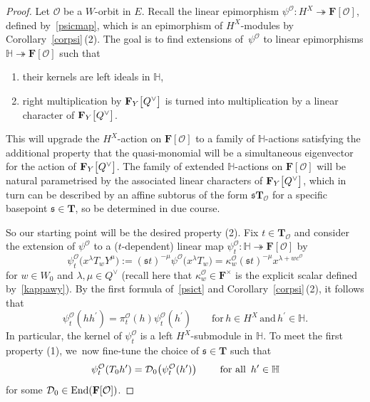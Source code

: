 \documentclass[11pt]{article}
\numberwithin{equation}{section}
\numberwithin{equation}{section}
\begin{document}
\begin{proof}
Let $\mathcal{O}$ be a $W$-orbit in $E$.
Recall the linear epimorphism $\psi^\mathcal{O}\colon H^X\twoheadrightarrow\mathbf{F}[\mathcal{O}]$,
defined by~\eqref{psicmap}, which is an epimorphism of $H^X$-modules by Corollary~\ref{corpsi}\,(2). The goal is to find extensions of~$\psi^{\mathcal{O}}$ to linear epimorphisms $\mathbb{H}\twoheadrightarrow\mathbf{F}[\mathcal{O}]$ such that
\begin{enumerate}\itemsep=0pt
\item[(1)] their kernels are left ideals in $\mathbb{H}$,
\item[(2)]
right multiplication by $\mathbf{F}_Y\smash{\bigl[Q^\vee\bigr]}$ is turned into multiplication by a linear character of $\mathbf{F}_Y\smash{\bigl[Q^\vee\bigr]}$.
\end{enumerate}
This will upgrade the $H^X$-action on $\mathbf{F}[\mathcal{O}]$ to a family of $\mathbb{H}$-actions satisfying the additional property that the quasi-monomial  will be a simultaneous eigenvector
for the action of $\mathbf{F}_Y\smash{\bigl[Q^\vee\bigr]}$. The family of extended $\mathbb{H}$-actions on $\mathbf{F}[\mathcal{O}]$ will be natural parametrised by the associated linear characters of $\mathbf{F}_Y\smash{\bigl[Q^\vee\bigr]}$, which in turn can be described by an affine subtorus of the form $\mathfrak{s}\mathbf{T}_{\mathcal{O}}$ for a specific basepoint $\mathfrak{s}\in\mathbf{T}$, so be determined in due course.

So our starting point will be the desired property (2). Fix $t\in\mathbf{T}_{\mathcal{O}}$ and consider the extension of $\psi^\mathcal{O}$ to a ($t$-dependent) linear map $\psi_{t}^\mathcal{O}\colon \mathbb{H}\twoheadrightarrow\mathbf{F}[\mathcal{O}]$ by
\begin{equation}\label{psict}
\psi_{t}^\mathcal{O}\bigl(x^\lambda T_wY^\mu\bigr):=(\mathfrak{s}t)^{-\mu}\psi^\mathcal{O}\bigl(x^\lambda T_w\bigr)=\kappa_w^\mathcal{O}(\mathfrak{s}t)^{-\mu}x^{\lambda+wc^\mathcal{O}}
\end{equation}
for $w\in W_0$ and $\lambda,\mu\in Q^\vee$ \big(recall here that $\kappa_w^\mathcal{O}\in\mathbf{F}^\times$ is the explicit scalar defined by~\eqref{kappawy}\big).
By the first formula of~\eqref{psict} and Corollary~\ref{corpsi}\,(2), it follows that
\[
\psi_{t}^\mathcal{O}(hh^\prime)
=\pi_{t}^\mathcal{O}(h)\psi_{t}^\mathcal{O}(h^\prime)\qquad \text{for}\, h\in H^X\, \text{and}\, h^\prime\in\mathbb{H}.
\]
In particular, the kernel of $\psi_{t}^\mathcal{O}$ is a left $H^X$-submodule in $\mathbb{H}$.
To meet the first property (1), we~now fine-tune the choice of $\mathfrak{s}\in\mathbf{T}$ such that
\[
\psi_{t}^{\mathcal{O}}(T_0h^\prime)=\mathcal{D}_0\bigl(\psi_{t}^\mathcal{O}(h^\prime)\bigr) \qquad \textup{ for all }\, h^\prime\in\mathbb{H}
\]
for some $\mathcal{D}_0\in\textup{End}(\mathbf{F}[\mathcal{O}])$.


\end{proof}
\end{document}
